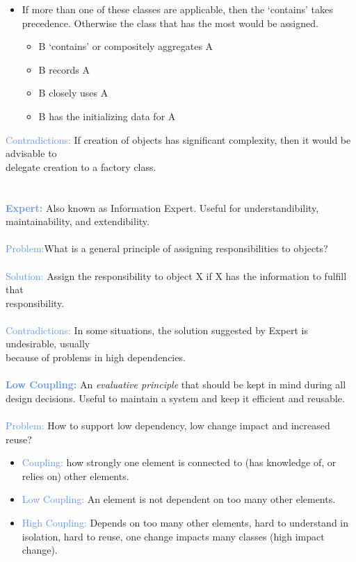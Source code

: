 \documentclass[a4paper,10pt]{article}
\begin{document}
\renewcommand{\labelitemi}{\textperiodcentered}
\begin{itemize}
\item If more than one of these classes are applicable, then the `contains' takes precedence. Otherwise the class that has the most would be assigned.
	\begin{itemize}
	\item B `contains' or compositely aggregates A 
	\item B records A 
	\item B closely uses A 
	\item B has the initializing data for A
	\end{itemize}
\end{itemize}
\indent \indent \textcolor{CornflowerBlue}{Contradictions:} If creation of objects has significant complexity, then it would be advisable to \\
\indent delegate creation to a factory class. \\\\
\\
\textcolor{CornflowerBlue}{\textbf{Expert:}} Also known as Information Expert. Useful for understandibility, maintainability, and extendibility.\\\\
\indent \textcolor{CornflowerBlue}{Problem:}What is a general principle of assigning responsibilities to objects? \\\\
\indent \textcolor{CornflowerBlue}{Solution:} Assign the responsibility to object X if X has the information to fulfill that \\
\indent responsibility. \\\\
\indent \textcolor{CornflowerBlue}{Contradictions:} In some situations, the solution suggested by Expert is undesirable, usually \\
\indent because of problems in high dependencies. \\\\
\newpage
\noindent \textcolor{CornflowerBlue}{\textbf{Low Coupling:}} An \emph{evaluative principle} that should be kept in mind during all design decisions. Useful to maintain a system and keep it efficient and reusable.\\\\
\indent \textcolor{CornflowerBlue}{Problem:} How to support low dependency, low change impact and increased reuse?
\renewcommand{\labelitemi}{\textperiodcentered}
\begin{itemize}
\item \textcolor{CornflowerBlue}{Coupling:} how strongly one element is connected to (has knowledge of, or relies on) other elements. 
\item \textcolor{CornflowerBlue}{Low Coupling:} An element is not dependent on too many other elements.
\item \textcolor{CornflowerBlue}{High Coupling:} Depends on too many other elements, hard to understand in isolation, hard to reuse, one change impacts many classes (high impact change).
\end{itemize}
\end{document}
